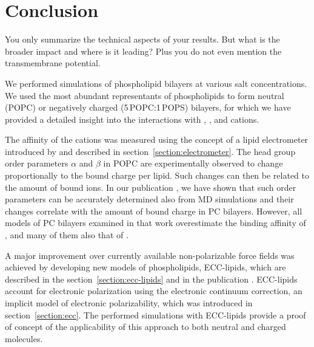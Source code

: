 \chapter*{Conclusion}

You only summarize the technical aspects of your results. 
But what is the broader impact and where is it leading?
Plus you do not even mention the transmembrane potential.


We performed simulations of phospholipid bilayers at various salt concentrations. 
We used the most abundant representants of phospholipids
to form neutral (POPC) or negatively charged (5\,POPC:1\,POPS) bilayers, 
for which we have provided a detailed insight 
into the interactions with 
, , and  cations. 

The affinity of the cations 
was measured using the concept of a lipid electrometer 
introduced by \citet{seelig87} 
and described in section~\ref{section:electrometer}.
The head group order parameters $\alpha$ and $\beta$ in POPC
are experimentally observed to change
proportionally to the bound charge per lipid. 
Such changes can then be related to the amount of bound ions.
In our publication \citep{catte16},
we have shown that such order parameters can be accurately determined also from MD simulations
and their changes correlate with the amount of bound charge in PC bilayers. 
However, all models of PC bilayers examined in that work
overestimate the binding affinity of , 
and many of them also that of . 

A major improvement over currently available non-polarizable force fields
was achieved by developing new models of phospholipids, 
ECC-lipids,
which are described in the section~\ref{section:ecc-lipids}
and in the publication \citep{melcr18}. 
ECC-lipids account for electronic polarization
using the electronic continuum correction,  
an implicit model of electronic polarizability, 
which was introduced in section~\ref{section:ecc}. 
The performed simulations with ECC-lipids 
provide a proof of concept of the applicability of this approach 
to both neutral and charged molecules. 

